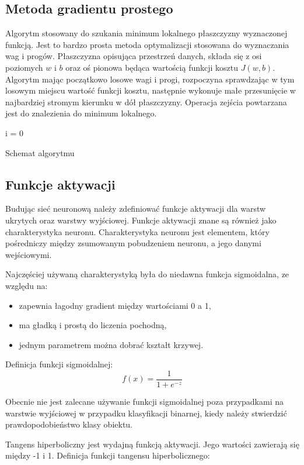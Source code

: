 \documentclass[12pt,a4paper,twoside,titlepage,openright]{book}
\newenvironment{algorytm}[1][htb]
  {\renewcommand{\algorithmcfname}{Algorytm}%
   \begin{algorithm}[#1]%
  }{\end{algorithm}}
\begin{document}
\begin{itemize}
\subsection{Metoda gradientu prostego}
Algorytm stosowany do szukania minimum lokalnego płaszczyzny wyznaczonej funkcją. Jest to bardzo prosta metoda optymalizacji stosowana do wyznaczania wag i progów. Płaszczyzna opisująca przestrzeń danych, składa się z osi poziomych \(w\) i \(b\) oraz oś pionowa będąca wartością funkcji kosztu \(J(w,b)\). Algorytm mając początkowo losowe wagi i progi, rozpoczyna sprawdzając w tym losowym miejscu wartość funkcji kosztu, następnie wykonuje małe przesunięcie w najbardziej stromym kierunku w dół płaszczyzny. Operacja zejścia powtarzana jest do znalezienia do minimum lokalnego.

\begin{algorytm}
i = 0\;
\caption{Schemat algorytmu}
\end{algorytm}

\subsection{Funkcje aktywacji}
Budując sieć neuronową należy zdefiniować funkcje aktywacji dla warstw ukrytych oraz warstwy wyjściowej. Funkcje aktywacji znane są również jako charakterystyka neuronu. Charakterystyka neuronu jest elementem, który pośredniczy między zsumowanym pobudzeniem neuronu, a jego danymi wejściowymi. 

Najczęściej używaną charakterystyką była do niedawna funkcja sigmoidalna, ze względu na:
\begin{itemize}
\item zapewnia łagodny gradient między wartościami 0 a 1,
\item ma gładką i prostą do liczenia pochodną,
\item jednym parametrem można dobrać kształt krzywej.
\end{itemize}

Definicja funkcji sigmoidalnej: $$f(x) = \frac{1}{1+e^{-z}}$$


Obecnie nie jest zalecane używanie funkcji sigmoidalnej poza przypadkami na warstwie wyjściowej w przypadku klasyfikacji binarnej, kiedy należy stwierdzić prawdopodobieństwo klasy obiektu.

Tangens hiperboliczny jest wydajną funkcją aktywacji. Jego wartości zawierają się między -1 i 1. Definicja funkcji tangensu hiperbolicznego:


\end{itemize}
\end{document}
